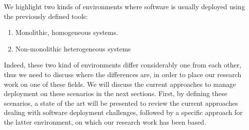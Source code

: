 We highlight two kinds of environments where software is usually deployed using the previously defined tools:
\begin{enumerate}
	\item Monolithic, homogeneous systems.
	\item Non-monolithic heterogeneous systems
\end{enumerate}

Indeed, these two kind of environments differ considerably one from each other, thus we need to discuss where the differences are, in order to place our research work on one of these fields.
We will discuss the current approaches to manage deployment on these scenarios in the next sections.
First, by defining these scenarios, a state of the art will be presented to review the current approaches dealing with software deployment challenges, followed by a specific approach for the latter environment, on which our research work has been based.

